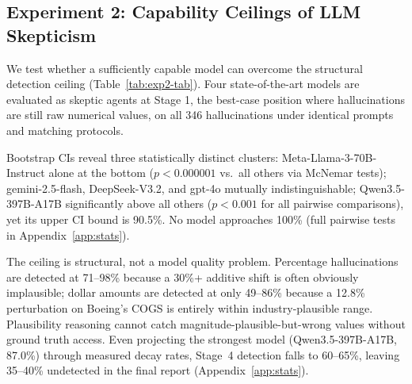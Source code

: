 \documentclass{article}
\theoremstyle{plain}
\theoremstyle{definition}
\theoremstyle{remark}
\begin{document}
\subsection{Experiment 2: Capability Ceilings of LLM Skepticism}
\label{sec:exp2}

We test whether a sufficiently capable model can overcome the structural detection ceiling (Table~\ref{tab:exp2-tab}). Four state-of-the-art models are evaluated as skeptic agents at Stage 1, the best-case position where hallucinations are still raw numerical values, on all 346 hallucinations under identical prompts and matching protocols.

\begin{table}[h]
\centering
{}
\vspace{5pt}
\caption{Stage 1 detection rates with 95\% bootstrap CIs (5,000 resamples).}
\label{tab:exp2-tab}
\end{table}

Bootstrap CIs reveal three statistically distinct clusters: Meta-Llama-3-70B-Instruct alone at the bottom ($p < 0.000001$ vs.\ all others via McNemar tests); gemini-2.5-flash, DeepSeek-V3.2, and gpt-4o mutually indistinguishable; Qwen3.5-397B-A17B significantly above all others ($p < 0.001$ for all pairwise comparisons), yet its upper CI bound is 90.5\%. No model approaches 100\% (full pairwise tests in Appendix~\ref{app:stats}).

The ceiling is structural, not a model quality problem. Percentage hallucinations are detected at 71--98\% because a 30\%+ additive shift is often obviously implausible; dollar amounts are detected at only 49--86\% because a 12.8\% perturbation on Boeing's COGS is entirely within industry-plausible range. Plausibility reasoning cannot catch magnitude-plausible-but-wrong values without ground truth access. Even projecting the strongest model (Qwen3.5-397B-A17B, 87.0\%) through measured decay rates, Stage~4 detection falls to 60--65\%, leaving 35--40\% undetected in the final report (Appendix~\ref{app:stats}).
\end{document}
